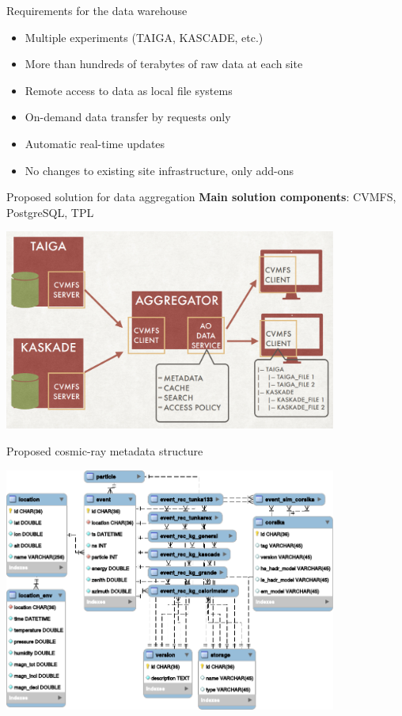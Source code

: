 
\begin{frame}{Requirements for the data warehouse}
 \begin{itemize}
    \item Multiple experiments (TAIGA, KASCADE, etc.)
    \item More than hundreds of terabytes of raw data at each site
    \item Remote access to data as local file systems
    \item  On-demand data transfer by requests only
    \item  Automatic real-time updates
    \item  No changes to existing site infrastructure, only add-ons
 \end{itemize}
\end{frame}

\begin{frame}{Proposed solution for data aggregation}
\textbf{Main solution components}: CVMFS, PostgreSQL, TPL
    \begin{center}
        \includegraphics[width=0.82\textwidth]{pics/agr.pdf}
    \end{center}

\end{frame}


\begin{frame}{Proposed cosmic-ray metadata structure}
    \vspace{-1.5em}
    \begin{center}
        \includegraphics[width=0.82\textwidth]{pics/metadata.pdf}
    \end{center}
\end{frame}


